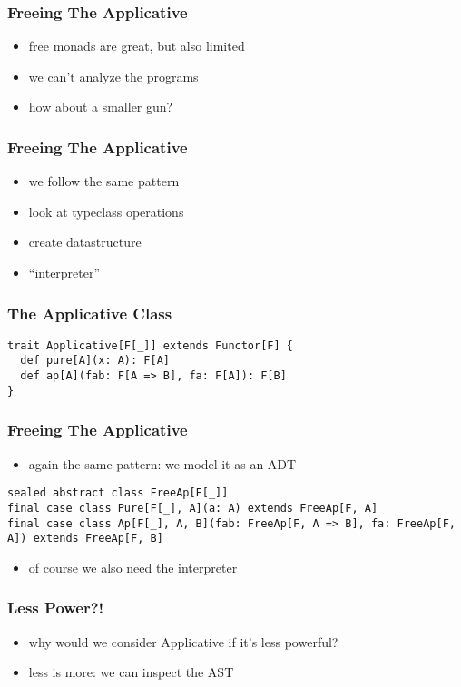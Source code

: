 \documentclass{beamer}
\begin{document}
\begin{frame}
  \frametitle{Freeing The Applicative}
  \begin{itemize}
  \item free monads are great, but also limited
  \item we can't analyze the programs
  \item how about a smaller gun?
  \end{itemize}
\end{frame}

\begin{frame}
  \frametitle{Freeing The Applicative}
  \begin{itemize}
  \item we follow the same pattern
  \item look at typeclass operations
  \item create datastructure
  \item ``interpreter''
  \end{itemize}
\end{frame}

\begin{frame}[fragile]
  \frametitle{The Applicative Class}
  \begin{verbatim}
trait Applicative[F[_]] extends Functor[F] {
  def pure[A](x: A): F[A]
  def ap[A](fab: F[A => B], fa: F[A]): F[B]
}
  \end{verbatim}
\end{frame}

\begin{frame}[fragile]
  \frametitle{Freeing The Applicative}
  \begin{itemize}
  \item again the same pattern: we model it as an ADT
  \end{itemize}
  \begin{verbatim}
sealed abstract class FreeAp[F[_]]
final case class Pure[F[_], A](a: A) extends FreeAp[F, A]
final case class Ap[F[_], A, B](fab: FreeAp[F, A => B], fa: FreeAp[F, A]) extends FreeAp[F, B]
\end{verbatim}
\begin{itemize}
\item of course we also need the interpreter
\end{itemize}
\end{frame}

\begin{frame}
  \frametitle{Less Power?!}
  \begin{itemize}
  \item why would we consider Applicative if it's less powerful?
  \item less is more: we can inspect the AST
  \end{itemize}
\end{frame}
\end{document}
